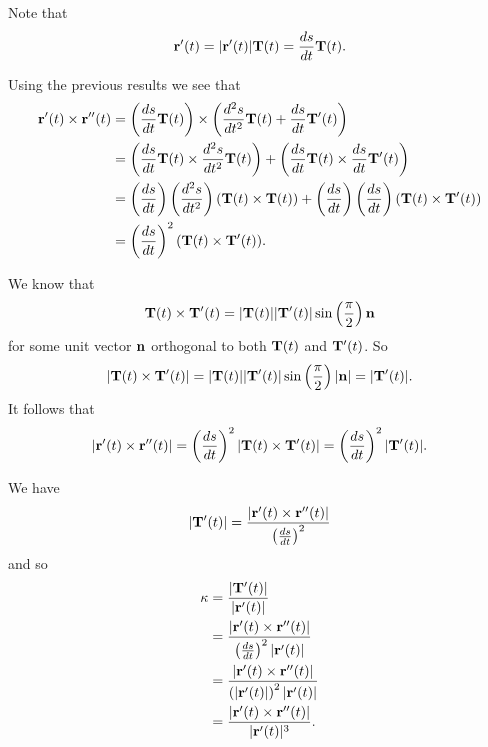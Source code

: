 \begin{exercises}
\begin{exerciseSolution}
	\item Note that 
\[\mathbf{r}'(t) = \lvert \mathbf{r}'(t) \rvert \mathbf{T}(t) = \frac{ds}{dt} \mathbf{T}(t).\]

	\item Using the previous results we see that 
\begin{align*}
\mathbf{r}'(t) \times \mathbf{r}''(t) &= \left( \frac{ds}{dt} \mathbf{T}(t) \right) \times \left( \frac{d^2s}{dt^2} \mathbf{T}(t) + \frac{ds}{dt} \mathbf{T}'(t) \right) \\
	&= \left( \frac{ds}{dt} \mathbf{T}(t) \times \frac{d^2s}{dt^2} \mathbf{T}(t) \right) + \left( \frac{ds}{dt} \mathbf{T}(t) \times \frac{ds}{dt} \mathbf{T}'(t) \right) \\
	&= \left( \frac{ds}{dt} \right) \left( \frac{d^2s}{dt^2} \right) \left( \mathbf{T}(t) \times \mathbf{T}(t) \right) + \left( \frac{ds}{dt} \right) \left( \frac{ds}{dt} \right) \left( \mathbf{T}(t) \times \mathbf{T}'(t) \right) \\
	&= \left(\frac{ds}{dt}\right)^2 (\mathbf{T}(t) \times \mathbf{T}'(t)).
\end{align*}

	\item We know that 
\[\mathbf{T}(t) \times \mathbf{T}'(t) = \lvert \mathbf{T}(t) \rvert \lvert \mathbf{T}'(t) \rvert \sin\left(\frac{\pi}{2}\right) \mathbf{n}\]
for some unit vector $\mathbf{n}$ orthogonal to both $\mathbf{T}(t)$ and $\mathbf{T}'(t)$. So 
\[\lvert \mathbf{T}(t) \times \mathbf{T}'(t) \rvert = \lvert \mathbf{T}(t) \rvert \lvert \mathbf{T}'(t) \rvert \sin\left(\frac{\pi}{2}\right) \lvert \mathbf{n} \rvert = \lvert \mathbf{T}'(t) \rvert.\]
It follows that 
\[\lvert \mathbf{r}'(t) \times \mathbf{r}''(t) \rvert = \left(\frac{ds}{dt}\right)^2 \lvert \mathbf{T}(t) \times \mathbf{T}'(t) \rvert = \left(\frac{ds}{dt}\right)^2 \lvert \mathbf{T}'(t) \rvert.\]

	\item We have 
 \[\lvert \mathbf{T}'(t) \rvert = \frac{\lvert \mathbf{r}'(t) \times \mathbf{r}''(t) \rvert}{\left(\frac{ds}{dt}\right)^2}\]
 and so
 \begin{align*}
\kappa &= \frac{\lvert \mathbf{T}'(t) \rvert }{\lvert \mathbf{r}'(t) \rvert} \\
	&= \frac{\lvert \mathbf{r}'(t) \times \mathbf{r}''(t) \rvert }{\left(\frac{ds}{dt}\right)^2 \lvert \mathbf{r}'(t) \rvert} \\
	&= \frac{\lvert \mathbf{r}'(t) \times \mathbf{r}''(t) \rvert }{\left( \lvert \mathbf{r}'(t) \rvert \right)^2 \lvert \mathbf{r}'(t) \rvert} \\
	&= \frac{\lvert \mathbf{r}'(t) \times \mathbf{r}''(t) \rvert}{\lvert \mathbf{r}'(t) \rvert^3}.
\end{align*}

	\ea
\end{exerciseSolution}


\end{exercises}

\afterexercises
